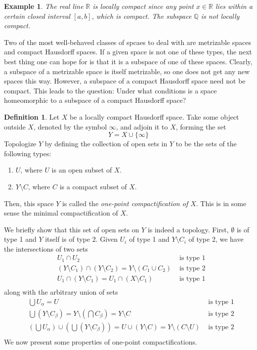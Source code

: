 \documentclass{article}
\newtheorem{example}{Example}[section]
\theoremstyle{remark}
\theoremstyle{definition}
\newtheorem{definition}{Definition}[section]
\begin{document}
\begin{example}
The real line $\mathbb{R}$ is locally compact since any point $x \in \mathbb{R}$ lies within a certain closed interval $[a,b]$, which is compact. The subspace $\mathbb{Q}$ is not locally compact. 
\end{example}

Two of the most well-behaved classes of spcaes to deal with are metrizable spaces and compact Hausdorff spaces. If a given space is not one of these types, the next best thing one can hope for is that it is a subspace of one of these spaces. Clearly, a subspace of a metrizable space is itself metrizable, so one does not get any new spaces this way. However, a subspace of a compact Hausdorff space need not be compact. This leads to the question: Under what conditions is a space homeomorphic to a subspace of a compact Hausdorff space? 

\begin{definition}
Let $X$ be a locally compact Hausdorff space. Take some object outside $X$, denoted by the symbol $\infty$, and adjoin it to $X$, forming the set
\[Y = X \cup \{\infty\}\]
Topologize $Y$ by defining the collection of open sets in $Y$ to be the sets of the following types:
\begin{enumerate}
    \item $U$, where $U$ is an open subset of $X$. 
    \item $Y \setminus C$, where $C$ is a compact subset of $X$.
\end{enumerate}
Then, this space $Y$ is called the \textit{one-point compactification of $X$}. This is in some sense the minimal compactification of $X$. 
\end{definition}
We briefly show that this set of open sets on $Y$ is indeed a topology. First, $\emptyset$ is of type 1 and $Y$ itself is of type 2. Given $U_i$ of type 1 and $Y \setminus C_i$ of type 2, we have the intersections of two sets
\begin{align*}
    &U_1 \cap U_2 & \text{ is type 1} \\
    &(Y \setminus C_1) \cap (Y \setminus C_2) = Y \setminus (C_1 \cup C_2) & \text{ is type 2} \\
    &U_1 \cap (Y \setminus C_1) = U_1 \cap (X \setminus C_1) & \text{ is type 1} \\
\end{align*}
along with the arbitrary union of sets
\begin{align*}
    &\bigcup U_\alpha = U & \text{ is type 1} \\
    &\bigcup (Y \setminus C_\beta) = Y \setminus (\bigcap C_\beta) = Y \setminus C & \text{ is type 2} \\
    &(\bigcup U_\alpha) \cup ( \bigcup (Y \setminus C_\beta)) = U \cup (Y \setminus C) = Y \setminus (C \setminus U) & \text{ is type 2} \\
\end{align*}
We now present some properties of one-point compactifications. 
\end{document}
